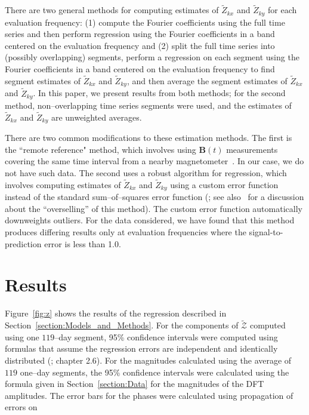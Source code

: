 \documentclass[draft,linenumbers]{agujournal2018}
\begin{document}
There are two general methods for computing estimates of $\widetilde{Z}_{kx}$ and $\widetilde{Z}_{ky}$ for each evaluation frequency: (1) compute the Fourier coefficients using the full time series and then perform regression using the Fourier coefficients in a band centered on the evaluation frequency and (2) split the full time series into (possibly overlapping) segments, perform a regression on each segment using the Fourier coefficients in a band centered on the evaluation frequency to find segment estimates of $\widetilde{Z}_{kx}$ and $\widetilde{Z}_{ky}$, and then average the segment estimates of $\widetilde{Z}_{kx}$ and $\widetilde{Z}_{ky}$. In this paper, we present results from both methods; for the second method, non--overlapping time series segments were used, and the estimates of $\widetilde{Z}_{kx}$ and $\widetilde{Z}_{ky}$ are unweighted averages. 

There are two common modifications to these estimation methods. The first is the ``remote reference"  method, which involves using $\mathbf{B}(t)$ measurements covering the same time interval from a nearby magnetometer~\citep{Simpson2005}. In our case, we do not have such data. The second uses a robust algorithm for regression, which involves computing estimates of $\widetilde{Z}_{kx}$ and $\widetilde{Z}_{ky}$ using a custom error function instead of the standard sum--of--squares error function (\cite{Simpson2005}; see also~\cite{Thomson2016} for a discussion about the ``overselling'' of this method). The custom error function automatically downweights outliers. For the data considered, we have found that this method produces differing results only at evaluation frequencies where the signal-to-prediction error is less than 1.0.

\section{Results}
\label{section:Results}

Figure~\ref{fig:z} shows the results of the regression described in Section~\ref{section:Models_and_Methods}. For the components of $\boldsymbol{\mathcal{\widetilde{Z}}}$ computed using one $119$--day segment, 95\% confidence intervals were computed using formulas that assume the regression errors are independent and identically distributed (\cite{Draper1981}; chapter 2.6). For the magnitudes calculated using the average of $119$ one--day segments, the 95\% confidence intervals were calculated using the formula given in Section~\ref{section:Data} for the magnitudes of the DFT amplitudes. The error bars for the phases were calculated using propagation of errors on
\end{document}
